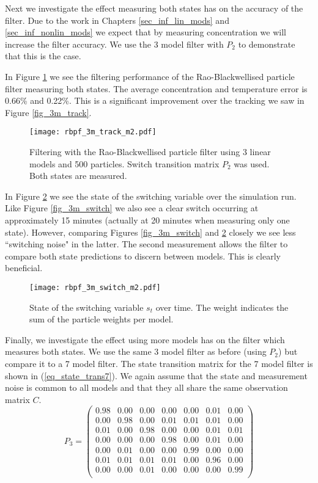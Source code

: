 Next we investigate the effect measuring both states has on the accuracy of the filter. Due to the work in Chapters \ref{sec_inf_lin_mods} and \ref{sec_inf_nonlin_mods} we expect that by measuring concentration we will increase the filter accuracy. We use the 3 model filter with $P_2$ to demonstrate that this is the case.

In Figure \ref{fig_3m_track_m2} we see the filtering performance of the Rao-Blackwellised particle filter measuring both states. The average concentration and temperature error is 0.66\% and 0.22\%. This is a significant improvement over the tracking we saw in Figure \ref{fig_3m_track}.
\begin{figure}[H] 
\centering
\texttt{[image: rbpf\_3m\_track\_m2.pdf]}
\caption{Filtering with the Rao-Blackwellised particle filter using 3 linear models and 500 particles. Switch transition matrix $P_2$ was used. Both states are measured.}
\label{fig_3m_track_m2}
\end{figure}
In Figure \ref{fig_3m_switch_m2} we see the state of the switching variable over the simulation run. Like Figure \ref{fig_3m_switch} we also see a clear switch occurring at approximately 15 minutes (actually at 20 minutes when measuring only one state). However, comparing Figures \ref{fig_3m_switch} and \ref{fig_3m_switch_m2} closely we see less ``switching noise" in the latter. The second measurement allows the filter to compare both state predictions to discern between models. This is clearly beneficial.
\begin{figure}[H] 
\centering
\texttt{[image: rbpf\_3m\_switch\_m2.pdf]}
\caption{State of the switching variable $s_t$ over time. The weight indicates the sum of the particle weights per model.}
\label{fig_3m_switch_m2}
\end{figure}
Finally, we investigate the effect using more models has on the filter which measures both states. We use the same 3 model filter as before (using $P_2$) but compare it to a 7 model filter. The state transition matrix for the 7 model filter is shown in (\ref{eq_state_trans7}). We again assume that the state and measurement noise is common to all models and that they all share the same observation matrix $C$.
\begin{equation}
P_3 = \begin{pmatrix}
0.98 & 0.00 & 0.00 & 0.00 & 0.00 & 0.01 & 0.00 \\
0.00 & 0.98 & 0.00 & 0.01 & 0.01 & 0.01 & 0.00 \\
0.01 & 0.00 & 0.98 & 0.00 & 0.00 & 0.01 & 0.01 \\
0.00 & 0.00 & 0.00 & 0.98 & 0.00 & 0.01 & 0.00 \\
0.00 & 0.01 & 0.00 & 0.00 & 0.99 & 0.00 & 0.00 \\
0.01 & 0.01 & 0.01 & 0.01 & 0.00 & 0.96 & 0.00 \\
0.00 & 0.00 & 0.01 & 0.00 & 0.00 & 0.00 & 0.99 \\
\end{pmatrix}
\label{eq_state_trans7}
\end{equation}
